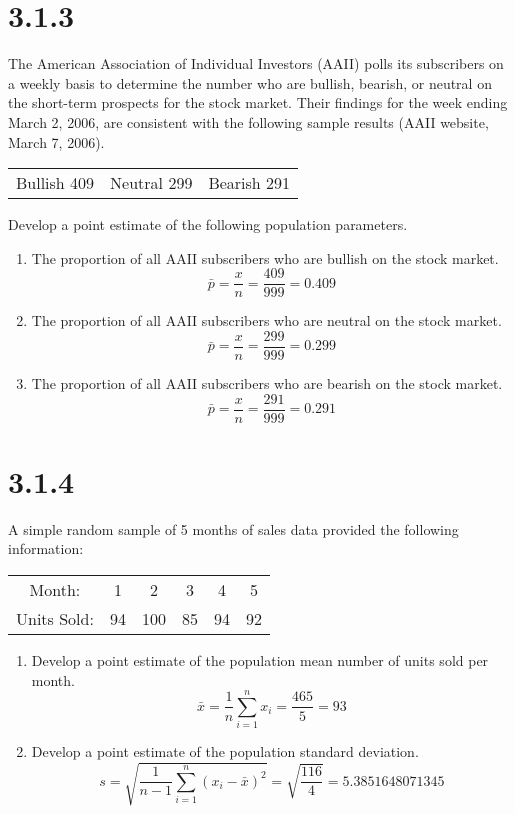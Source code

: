 \documentclass{article}
\begin{document}
\section*{3.1.3}
The American Association of Individual Investors (AAII) polls its subscribers on a weekly basis to determine the number who are bullish, bearish, or neutral on the short-term prospects for the stock market. Their findings for the week ending March 2, 2006, are consistent with the following sample results (AAII website, March 7, 2006).
\begin{table}[h!]
  \centering
  \begin{tabular}{c c c}
    Bullish 409 &Neutral 299 &Bearish 291\\
  \end{tabular}
\end{table}
Develop a point estimate of the following population parameters.
\begin{enumerate}
  \item The proportion of all AAII subscribers who are bullish on the stock market.
  \begin{equation*}
    \bar{p} = \frac{x}{n} = \frac{409}{999} = 0.409
  \end{equation*}
  \item The proportion of all AAII subscribers who are neutral on the stock market.
  \begin{equation*}
    \bar{p} = \frac{x}{n} = \frac{299}{999} = 0.299
  \end{equation*}
  \item The proportion of all AAII subscribers who are bearish on the stock market.
  \begin{equation*}
    \bar{p} = \frac{x}{n} = \frac{291}{999} = 0.291
  \end{equation*}
\end{enumerate}

\section*{3.1.4}
A simple random sample of 5 months of sales data provided the following information:
\begin{table}[h!]
  \centering
  \begin{tabular}{c c c c c c}
    Month: &1 &2 &3 &4 &5 \\
    Units Sold: &94 &100 &85 &94 &92\\
  \end{tabular}
\end{table}
\begin{enumerate}
  \item Develop a point estimate of the population mean number of units sold per month.
  \begin{equation*}
    \bar{x} = \frac{1}{n} \sum_{i=1}^{n} x_{i} = \frac{465}{5} = 93
  \end{equation*}
  \item Develop a point estimate of the population standard deviation.
  \begin{equation*}
    s = \sqrt{\frac{1}{n - 1} \sum_{i=1}^{n}(x_{i} - \bar{x})^{2}} = \sqrt{\frac{116}{4}}= 5.3851648071345
  \end{equation*}
\end{enumerate}
\end{document}
